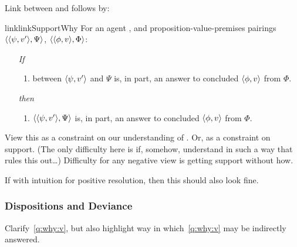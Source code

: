 \begin{note}
  Link between \qWhy{} and \qWhyV{} follows by:

  \begin{restatable}{link}{linkSupportWhy}
    \label{link:why:support:pvpp}
    For an agent \vAgent{}, and proposition-value-premises pairings \(\langle \langle \psi, v' \rangle, \Psi \rangle\), \(\langle \langle \phi, v \rangle, \Phi \rangle\):

    \begin{itemize}
    \item[\emph{If}]
      \begin{enumerate}[label=\alph*., ref=(\alph*)]
      \item
         between \(\langle \psi, v' \rangle\) and \(\Psi\) is, in part, an answer to \qWhyV{} \vAgent{} concluded \(\langle \phi, v \rangle\) from \(\Phi\).
      \end{enumerate}
    \item[\emph{then}]
      \begin{enumerate}[label=\alph*., ref=(\alph*), resume]
      \item
        \(\langle \langle \psi, v' \rangle, \Psi \rangle\) is, in part, an answer to \qWhy{} \vAgent{} concluded \(\langle \phi, v \rangle\) from \(\Phi\).
      \end{enumerate}
    \end{itemize}
    \vspace{-\baselineskip}
  \end{restatable}
  {
    \color{red}
    View this as a constraint on our understanding of \qWhy{}.
    Or, as a constraint on support.
    (The only difficulty here is if, somehow, understand \qWhy{} in such a way that rules this out\dots)
  }
  Difficulty for any negative view is getting support without how.

  If with intuition for positive resolution, then this should also look fine.
\end{note}

\subsubsection{Dispositions and Deviance}
\label{cha:clarification:sec:dis-and-dev}

\begin{note}
  Clarify~\autoref{q:why:v}, but also highlight way in which~\autoref{q:why:v} may be indirectly answered.
\end{note}

